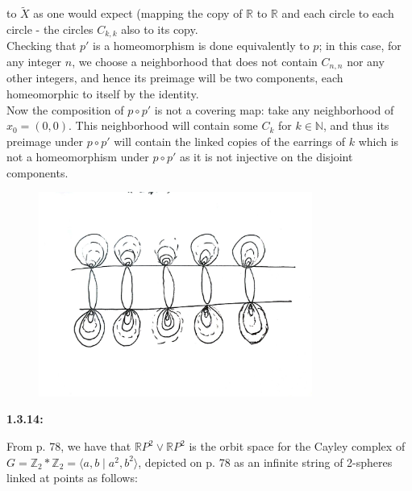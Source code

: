 \documentclass[a4paper]{article}
\begin{document}
    to $\tilde{X}$ as one would expect (mapping the
    copy of $\mathbb{R}$ to $\mathbb{R}$ and each
    circle to each circle - the circles $C_{k,k}$ also to
    its copy.\\
    \linebreak
    Checking that $p'$ is a homeomorphism is done equivalently
    to $p$; in this case, for any integer  $n$, we choose
    a neighborhood that does not contain $C_{n,n}$ nor
    any other integers, and hence its preimage
    will be two components, each homeomorphic to itself by the identity.\\
    \linebreak
    Now the composition of $p \circ p'$ is not a covering map:
    take any neighborhood of $x_0 = (0,0)$. This
    neighborhood will contain some $C_k$ for $k \in \mathbb{N}$,
    and thus its preimage under $p\circ p'$ will contain
    the linked copies of the earrings of $k$ which
    is not a homeomorphism under $p \circ p'$ as it is not injective
    on the disjoint components.\\

\begin{figure}[h]
    \centering
    \includegraphics[width=0.8\textwidth]{1.jpg}
    \label{fig:1-jpg}
\end{figure}



    \linebreak
    \textbf{1.3.14:} 

    From p. 78, we have that $\mathbb{R}P^2 \vee \mathbb{R}P^2$ is the orbit
    space for the Cayley complex of $G = \mathbb{Z}_2 * \mathbb{Z}_2
    = \langle a,b  \mid a^2, b^2 \rangle$, depicted on p. 78 as an infinite
    string of 2-spheres linked at points as follows:
\end{document}
